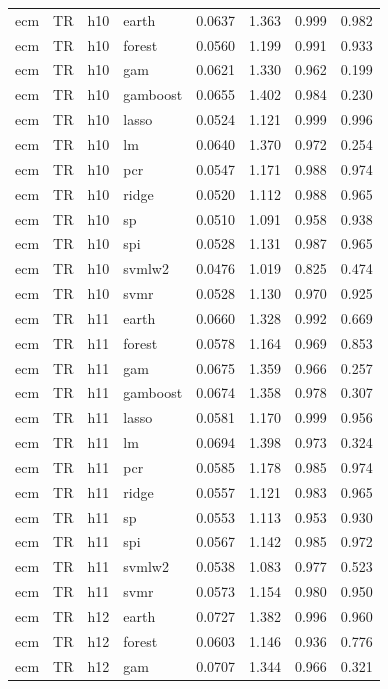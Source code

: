 \begin{ThreePartTable}
\begin{longtable}[t]{llclcccc}
\addlinespace
ecm & TR & h10 & earth & 0.0637 & 1.363 & 0.999 & 0.982\\
ecm & TR & h10 & forest & 0.0560 & 1.199 & 0.991 & 0.933\\
ecm & TR & h10 & gam & 0.0621 & 1.330 & 0.962 & 0.199\\
ecm & TR & h10 & gamboost & 0.0655 & 1.402 & 0.984 & 0.230\\
ecm & TR & h10 & lasso & 0.0524 & 1.121 & 0.999 & 0.996\\
ecm & TR & h10 & lm & 0.0640 & 1.370 & 0.972 & 0.254\\
ecm & TR & h10 & pcr & 0.0547 & 1.171 & 0.988 & 0.974\\
ecm & TR & h10 & ridge & 0.0520 & 1.112 & 0.988 & 0.965\\
ecm & TR & h10 & sp & 0.0510 & 1.091 & 0.958 & 0.938\\
ecm & TR & h10 & spi & 0.0528 & 1.131 & 0.987 & 0.965\\
ecm & TR & h10 & svmlw2 & 0.0476 & 1.019 & 0.825 & 0.474\\
ecm & TR & h10 & svmr & 0.0528 & 1.130 & 0.970 & 0.925\\
\addlinespace
ecm & TR & h11 & earth & 0.0660 & 1.328 & 0.992 & 0.669\\
ecm & TR & h11 & forest & 0.0578 & 1.164 & 0.969 & 0.853\\
ecm & TR & h11 & gam & 0.0675 & 1.359 & 0.966 & 0.257\\
ecm & TR & h11 & gamboost & 0.0674 & 1.358 & 0.978 & 0.307\\
ecm & TR & h11 & lasso & 0.0581 & 1.170 & 0.999 & 0.956\\
ecm & TR & h11 & lm & 0.0694 & 1.398 & 0.973 & 0.324\\
ecm & TR & h11 & pcr & 0.0585 & 1.178 & 0.985 & 0.974\\
ecm & TR & h11 & ridge & 0.0557 & 1.121 & 0.983 & 0.965\\
ecm & TR & h11 & sp & 0.0553 & 1.113 & 0.953 & 0.930\\
ecm & TR & h11 & spi & 0.0567 & 1.142 & 0.985 & 0.972\\
ecm & TR & h11 & svmlw2 & 0.0538 & 1.083 & 0.977 & 0.523\\
ecm & TR & h11 & svmr & 0.0573 & 1.154 & 0.980 & 0.950\\
\addlinespace
ecm & TR & h12 & earth & 0.0727 & 1.382 & 0.996 & 0.960\\
ecm & TR & h12 & forest & 0.0603 & 1.146 & 0.936 & 0.776\\
ecm & TR & h12 & gam & 0.0707 & 1.344 & 0.966 & 0.321\\

\end{longtable}
\end{ThreePartTable}
